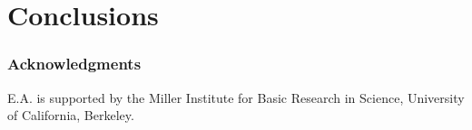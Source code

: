 \section{Conclusions}

\subsubsection*{Acknowledgments}

E.A. is supported by the Miller Institute for Basic Research in Science, University of California, Berkeley.



